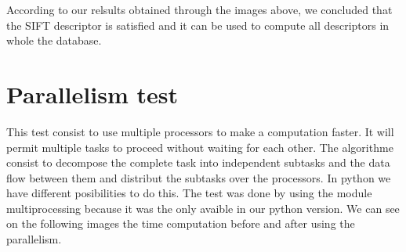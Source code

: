 \documentclass[12pt]{article}
\begin{document}
\begin{figure}[!h]
\centering     %
{}

\end{figure}
 
 According to our relsults obtained through the images above, we concluded that the SIFT descriptor is satisfied and it can be used to compute all descriptors in whole the database. 
 
 \section{ Parallelism test}
 
This test consist to use multiple processors to make a computation faster. It will permit multiple tasks to proceed without waiting for each other.
The algorithme consist to decompose the complete task into independent subtasks and the data flow between them and distribut the subtasks over the processors.
In python we have different posibilities to do this. The test was done by using the module multiprocessing because it was the only avaible in our python version.
We can see on the following images the time computation before and after using the parallelism.
\end{document}
